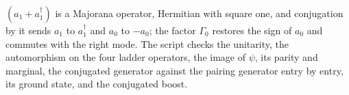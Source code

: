 $(a_{1} + a^{\dagger}_{1})$ is a Majorana operator, Hermitian with square one, and conjugation by it sends $a_{1}$ to $a^{\dagger}_{1}$ and $a_{0}$ to $-a_{0}$; the factor $\Gamma_{0}$ restores the sign of $a_{0}$ and commutes with the right mode. The script checks the unitarity, the automorphism on the four ladder operators, the image of $\psi$, its parity and marginal, the conjugated generator against the pairing generator entry by entry, its ground state, and the conjugated boost.
